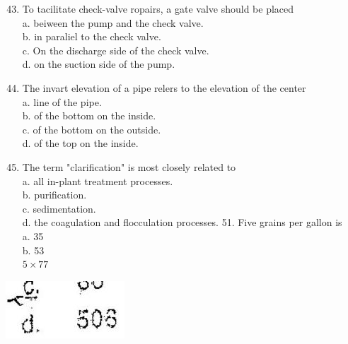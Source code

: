 \documentclass[10pt]{article}
\begin{document}
\begin{enumerate}
  \setcounter{enumi}{42}
  \item To tacilitate check-valve ropairs, a gate valve should be placed\\
a. beiween the pump and the check valve.\\
b. in paraliel to the check valve.\\
c. On the discharge side of the check valve.\\
d. on the suction side of the pump.

  \item The invart elevation of a pipe relers to the elevation of the center\\
a. line of the pipe.\\
b. of the bottom on the inside.\\
c. of the bottom on the outside.\\
d. of the top on the inside.

  \item The term "clarification" is most closely related to\\
a. all in-plant treatment processes.\\
b. purification.\\
c. sedimentation.\\
d. the coagulation and flocculation processes. 51. Five grains per gallon is\\
a. 35\\
b. 53\\
$5 \times 77$

\end{enumerate}

\includegraphics[max width=\textwidth]{2022_11_11_ca6a6c1a0324ee23e523g-09}
\end{document}
